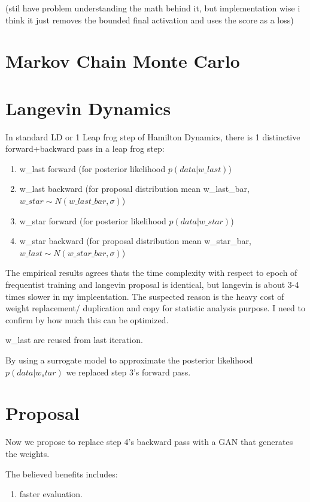 \documentclass[honours,12pt]{unswthesis}
\numberwithin{equation}{section}
\begin{document}
(stil have problem understanding the math behind it, but implementation wise i think it just removes the bounded final activation and uses the score as a loss) 

\section{Markov Chain Monte Carlo}

\section{Langevin Dynamics}
In standard LD or 1 Leap frog step of Hamilton Dynamics, there is 1 distinctive forward+backward pass in a leap frog step:

\begin{enumerate}
    \item w\_last forward (for posterior likelihood $p(data|w\_last)$)
    \item w\_last backward (for proposal distribution mean w\_last\_bar,$w\_star \sim N(w\_last\_bar,\sigma)$) 
    \item w\_star forward (for posterior likelihood $p(data|w\_star)$)
    \item w\_star backward (for proposal distribution mean w\_star\_bar,$w\_last \sim N(w\_star\_bar,\sigma)$) 
\end{enumerate}

The empirical results agrees thats the time complexity with respect to epoch of frequentist training and langevin proposal is identical, but langevin is about 3-4 times slower in my impleentation. The suspected reason is the heavy cost of weight replacement/ duplication and copy for statistic analysis purpose. I need to confirm by how much this can be optimized. 

w\_last are reused from last iteration.

By using a surrogate model to approximate the posterior likelihood $p(data|w_star)$ we replaced step 3's forward pass.

\section{Proposal}
Now we propose to replace step 4's backward pass with a GAN that generates the weights.

The believed benefits includes:
\begin{enumerate}
\item faster evaluation.
\end{enumerate}
\end{document}
